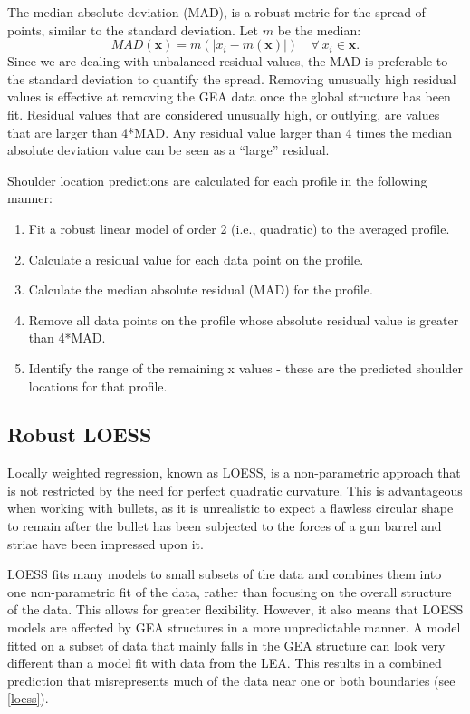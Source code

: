 \documentclass[]{article}
\begin{document}
The median absolute deviation (MAD), is a robust metric for the spread
of points, similar to the standard deviation. Let \(m\) be the median:\\
\[ MAD(\mathbf{x}) = m(|x_i- m(\mathbf{x})|) \quad \forall\ x_i \in \mathbf{x}.\]
Since we are dealing with unbalanced residual values, the MAD is
preferable to the standard deviation to quantify the spread. Removing
unusually high residual values is effective at removing the GEA data
once the global structure has been fit. Residual values that are
considered unusually high, or outlying, are values that are larger than
4*MAD. Any residual value larger than 4 times the median absolute
deviation value can be seen as a ``large'' residual.

Shoulder location predictions are calculated for each profile in the
following manner:\\

\begin{enumerate}
\item Fit a robust linear model of order 2 (i.e., quadratic) to the averaged profile.   
\item Calculate a residual value for each data point on the profile.  
\item Calculate the median absolute residual (MAD) for the profile.  
\item Remove all data points on the profile whose absolute residual value is greater than 4*MAD.  
\item Identify the range of the remaining x values - these are the predicted shoulder locations for that profile.   
\end{enumerate}

\subsection{Robust LOESS}

Locally weighted regression, known as LOESS, is a non-parametric
approach that is not restricted by the need for perfect quadratic
curvature. This is advantageous when working with bullets, as it is
unrealistic to expect a flawless circular shape to remain after the
bullet has been subjected to the forces of a gun barrel and striae have
been impressed upon it.

LOESS fits many models to small subsets of the data and combines them
into one non-parametric fit of the data, rather than focusing on the
overall structure of the data. This allows for greater flexibility.
However, it also means that LOESS models are affected by GEA structures
in a more unpredictable manner. A model fitted on a subset of data that
mainly falls in the GEA structure can look very different than a model
fit with data from the LEA. This results in a combined prediction that
misrepresents much of the data near one or both boundaries (see
\autoref{loess}).
\end{document}
